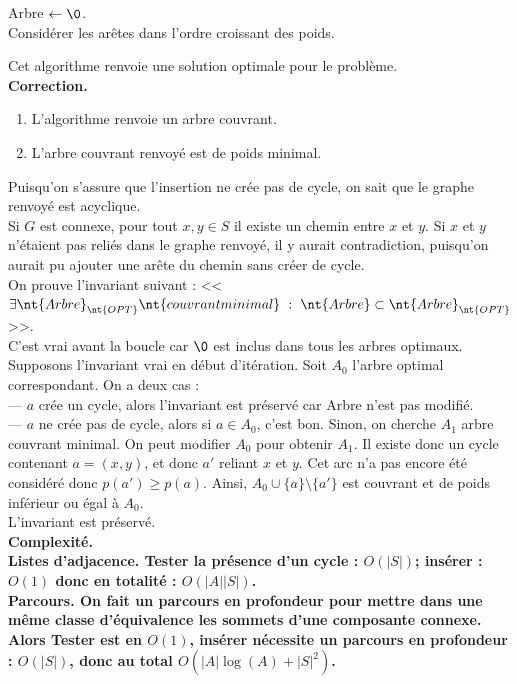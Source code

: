 \documentclass[french, 11pt]{article}
\begin{document}
\begin{defi}{}{}
    \begin{algorithm}[H]
        \caption{de Kruskal.}
        Arbre $\gets\0$.\\
        Considérer les arêtes dans l'ordre croissant des poids.\\
    \end{algorithm}
    Cet algorithme renvoie une solution optimale pour le problème.\\
    \bf{Correction.}
    \begin{enumerate}
        \item L'algorithme renvoie un arbre couvrant.
        \item L'arbre couvrant renvoyé est de poids minimal.
    \end{enumerate}
     Puisqu'on s'assure que l'insertion ne crée pas de cycle, on sait que le graphe renvoyé est acyclique.\\Si $G$ est connexe, pour tout $x,y\in S$ il existe un chemin entre $x$ et $y$.
    Si $x$ et $y$ n'étaient pas reliés dans le graphe renvoyé, il y aurait contradiction, puisqu'on aurait pu ajouter une arête du chemin sans créer de cycle.\\
     On prouve l'invariant suivant : << $\exists\nt{Arbre}_{\nt{OPT}} \nt{ couvrant minimal} ~ : ~ \nt{Arbre} \subset \nt{Arbre}_{\nt{OPT}}$ >>.\\
    C'est vrai avant la boucle car $\0$ est inclus dans tous les arbres optimaux. Supposons l'invariant vrai en début d'itération. Soit $A_0$ l'arbre optimal correspondant. On a deux cas :\\
    --- $a$ crée un cycle, alors l'invariant est préservé car Arbre n'est pas modifié.\\
    --- $a$ ne crée pas de cycle, alors si $a\in A_0$, c'est bon. Sinon, on cherche $A_1$ arbre couvrant minimal. On peut modifier $A_0$ pour obtenir $A_1$.
    Il existe donc un cycle contenant $a=(x,y)$, et donc $a'$ reliant $x$ et $y$. Cet arc n'a pas encore été considéré donc $p(a')\geq p(a)$. Ainsi, $A_0\cup\{a\}\setminus\{a'\}$ est couvrant et de poids inférieur ou égal à $A_0$.\\
    L'invariant est préservé.\\
    \bf{Complexité.}\\
    \bf{Listes d'adjacence.} Tester la présence d'un cycle : $O(|S|)$; insérer : $O(1)$ donc en totalité : $O(|A||S|)$.\\
    \bf{Parcours.} On fait un parcours en profondeur pour mettre dans une même classe d'équivalence les sommets d'une composante connexe.
    Alors Tester est en $O(1)$, insérer nécessite un parcours en profondeur : $O(|S|)$, donc au total $O(|A|\log(A)+|S|^2)$.
\end{defi}
\end{document}

